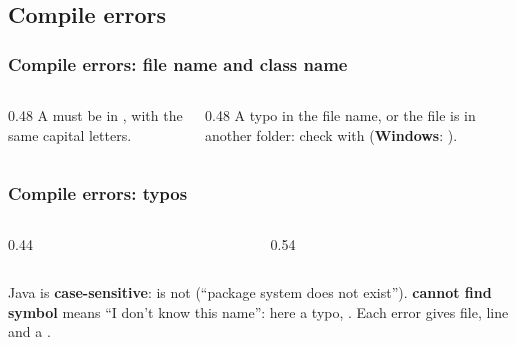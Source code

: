 \documentclass[aspectratio=169,10pt,compress]{beamer}
\newcommand{\win}{\textbf{Windows}}
\begin{document}
\subsection[Compile errors]{Compile errors}




\begin{frame}[t,fragile] \frametitle{Compile errors: file name and class name}
  \begin{columns}[T]
    \begin{column}{0.48\textwidth}
      \footnotesize A  must be in , with the same capital letters.
    \end{column}
    \begin{column}{0.48\textwidth}
      \footnotesize A typo in the file name, or the file is in another folder: check with  (\win: ).
    \end{column}
  \end{columns}
\end{frame}




\begin{frame}[t,fragile] \frametitle{Compile errors: typos}
  \begin{columns}[T]
    \begin{column}{0.44\textwidth}
    \end{column}
    \begin{column}{0.54\textwidth}
    \end{column}
  \end{columns}

  \vspace{0.1em}
  \small Java is \textbf{case-sensitive}:  is not  (``package system does not exist'').
  \textbf{cannot find symbol} means ``I don't know this name'': here a typo, . Each error gives file, line and a \hCode{\^{}}.
\end{frame}
\end{document}
